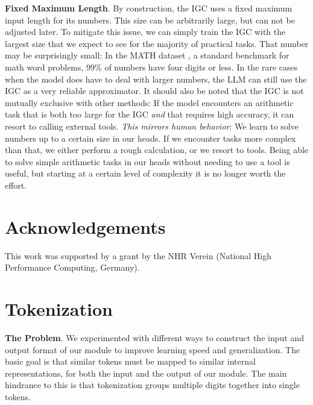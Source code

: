 \documentclass[11pt]{article}
\begin{document}
\textbf{Fixed Maximum Length}.
By construction, the IGC uses a fixed maximum input length for its numbers. This size can be arbitrarily large, but can not be adjusted later.
To mitigate this issue, we can simply train the IGC with the largest size that we expect to see for the majority of practical tasks.
That number may be surprisingly small: In the MATH dataset \citep{hendrycksmath2021}, a standard benchmark for math word problems, 99\% of numbers have four digits or less.
In the rare cases when the model does have to deal with larger numbers, the LLM can still use the IGC as a very reliable approximator.
It should also be noted that the IGC is not mutually exclusive with other methods: If the model encounters an arithmetic task that is both too large for the IGC \textit{and} that requires high accuracy, it can resort to calling external tools.
\textit{This mirrors human behavior}: We learn to solve numbers up to a certain size in our heads. If we encounter tasks more complex than that, we either perform a rough calculation, or we resort to tools.
Being able to solve simple arithmetic tasks in our heads without needing to use a tool is useful, but starting at a certain level of complexity it is no longer worth the effort.


\section{Acknowledgements}


This work was supported by a grant by the NHR Verein (National High Performance Computing, Germany).






\appendix





\section{Tokenization}
\label{section-tokenization}


\textbf{The Problem}.
We experimented with different ways to construct the input and output format of our module to improve learning speed and generalization.
The basic goal is that similar tokens must be mapped to similar internal representations, for both the input and the output of our module.
The main hindrance to this is that tokenization groups multiple digits together into single tokens.
\end{document}
